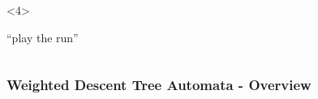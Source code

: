 \documentclass{beamer}
\begin{document}
\begin{frame}
\begin{overlayarea}{\textwidth}{0.8\textheight}
\begin{columns}
\begin{column}{0.65\textwidth}
\begin{onlyenv}
          \end{onlyenv}
          \begin{onlyenv}<4>
            \begin{center}
              \enquote{play the run}
            \end{center}
          \end{onlyenv}
        \end{column}
      \end{columns}
    \end{overlayarea}
  \end{frame}

  \begin{frame}
    \frametitle{Weighted Descent Tree Automata - Overview}
  \end{frame}
\end{document}
